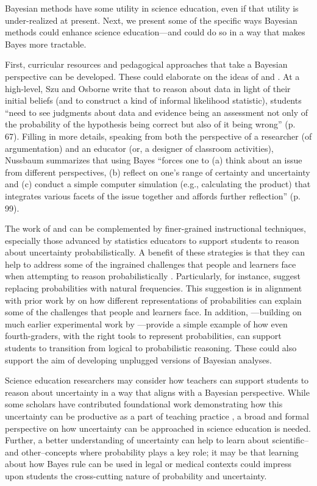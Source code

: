 \documentclass[man]{apa7}
\begin{document}
Bayesian methods have some utility in science education, even if that utility is under-realized at present. Next, we present some of the specific ways Bayesian methods could enhance science education—and could do so in a way that makes Bayes more tractable.

First, curricular resources and pedagogical approaches that take a Bayesian perspective can be developed. These could elaborate on the ideas of \textcite{so12} and \textcite{n11}. At a high-level, Szu and Osborne write that to reason about data in light of their initial beliefs (and to construct a kind of informal likelihood statistic), students “need to see judgments about data and evidence being an assessment not only of the probability of the hypothesis being correct but also of it being wrong” (p. 67). Filling in more details, speaking from both the perspective of a researcher (of argumentation) and an educator (or, a designer of classroom activities), Nussbaum summarizes that using Bayes “forces one to (a) think about an issue from different perspectives, (b) reflect on one’s range of certainty and uncertainty and (c) conduct a simple computer simulation (e.g., calculating the product) that integrates various facets of the issue together and affords further reflection” (p. 99). 

The work of \textcite{so12} and \textcite{n11} can be complemented by finer-grained instructional techniques, especially those advanced by statistics educators to support students to reason about uncertainty probabilistically. A benefit of these strategies is that they can help to address some of the ingrained challenges that people and learners face when attempting to reason probabilistically \parencite[e.g., ][]{tk74}. Particularly, \textcite{bkbm18} for instance, suggest replacing probabilities with natural frequencies. This suggestion is in alignment with prior work by \textcite{gh95} on how different representations of probabilities can explain some of the challenges that people and learners face. In addition, \textcite{me14}—building on much earlier experimental work by \textcite{wason1971natural}—provide a simple example of how even fourth-graders, with the right tools to represent probabilities, can support students to transition from logical to probabilistic reasoning. These could also support the aim of developing unplugged versions of Bayesian analyses. 

Science education researchers may consider how teachers can support students to reason about uncertainty in a way that aligns with a Bayesian perspective. While some scholars have contributed foundational work demonstrating how this uncertainty can be productive as a part of teaching practice \parencite{manz2018supporting}, a broad and formal perspective on how uncertainty can be approached in science education is needed. Further, a better understanding of uncertainty can help to learn about scientific--and other--concepts where probability plays a key role; it may be that learning about how Bayes rule can be used in legal or medical contexts could impress upon students the cross-cutting nature of probability and uncertainty.  
\end{document}
